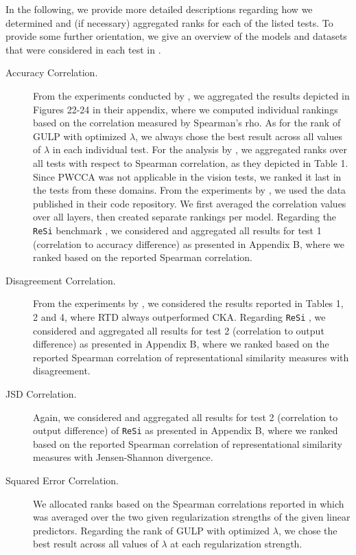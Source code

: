 \documentclass{article}
\newcommand{\citet}{\textcite}
\begin{document}
\begin{refsegment}
In the following, we provide more detailed descriptions regarding how we determined and (if necessary) aggregated ranks for each of the listed tests.
To provide some further orientation, we give an overview of the models and datasets that were considered in each test in .
%
\begin{description}
    \item[Accuracy Correlation.] From the experiments conducted by \citet{boix-adsera_gulp_2022}, we aggregated the results depicted in Figures 22-24 in their appendix, where we computed individual rankings based on the correlation measured by Spearman's rho. As for the rank of GULP with optimized $\lambda$, we always chose the best result across all values of $\lambda$ in each individual test.
    For the analysis by \citet{ding_grounding_2021}, we aggregated ranks over all tests with respect to Spearman correlation, as they depicted in Table 1. Since PWCCA was not applicable in the vision tests, we ranked it last in the tests from these domains.
    From the experiments by \citet{hayne2024does}, we used the data published in their code repository.
    We first averaged the correlation values over all layers, then created separate rankings per model.
    Regarding the \texttt{ReSi} benchmark \cite{resi_benchmark_2024}, we considered and aggregated all results for test 1 (correlation to accuracy difference) as presented in Appendix B, where we ranked based on the reported Spearman correlation.
%
    \item[Disagreement Correlation.] From the experiments by \citet{barannikov_representation_2022}, we considered the results reported in Tables 1, 2 and 4, where RTD always outperformed CKA.
    Regarding \texttt{ReSi} \cite{resi_benchmark_2024}, we considered and aggregated all results for test 2 (correlation to output difference) as presented in Appendix B, where we ranked based on the reported Spearman correlation of representational similarity measures with disagreement.
%
    \item[JSD Correlation.] Again, we considered and aggregated all results for test 2 (correlation to output difference) of \texttt{ReSi} \cite{resi_benchmark_2024} as presented in Appendix B, where we ranked based on the reported Spearman correlation of representational similarity measures with Jensen-Shannon divergence.
%
    \item[Squared Error Correlation.] We allocated ranks based on the Spearman correlations reported in \cite[Figure 4]{boix-adsera_gulp_2022} which was averaged over the two given regularization strengths of the given linear predictors. Regarding the rank of GULP with optimized $\lambda$, we chose the best result across all values of $\lambda$ at each regularization strength.

\end{description}
\end{refsegment}
\end{document}
